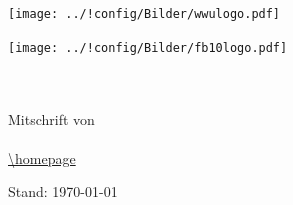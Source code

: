 \begin{titlepage}
\pagestyle{empty}
\begin{center}
\begin{minipage}{0.4\textwidth}
\begin{flushleft}
\texttt{[image: ../!config/Bilder/wwulogo.pdf]}
\end{flushleft}
\end{minipage}
\hfill
\begin{minipage}{0.4\textwidth}
\begin{flushright}
\vspace*{0.3cm}
\texttt{[image: ../!config/Bilder/fb10logo.pdf]} \
\end{flushright}
\end{minipage}

\vspace*{6cm}
\textbf{\Huge{\fach}} \\
\vspace{0.2cm} 
\textbf{{\LARGE \untertitel}} \\
\vspace{0.6cm}
\LARGE{Mitschrift von \verfasser} \\
\vspace{0.6cm}
\LARGE{\semester} \\
\vspace*{2cm}
\footnotesize{\url{\homepage}}
\vfill

\vspace*{2cm}
\begin{flushright}
{\footnotesize Stand: \today}
\end{flushright}
\end{center}
\end{titlepage}